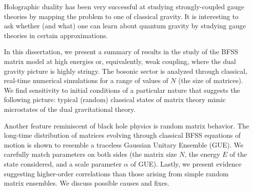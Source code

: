 Holographic duality has been very successful at studying strongly-coupled gauge theories by mapping the problem to one of classical gravity. It is interesting to ask whether (and what) one can learn about quantum gravity by studying gauge theories in certain approximations. 

In this dissertation, we present a summary of results in the study of the BFSS matrix model at high energies or, equivalently, weak coupling, where the dual gravity picture is highly stringy. The bosonic sector is analyzed through classical, real-time numerical simulations for a range of values of $N$ (the size of matrices). We find sensitivity to initial conditions of a particular nature that suggests the following picture: typical (random) classical states of matrix theory mimic microstates of the dual gravitational theory. 

Another feature reminiscent of black hole physics is random matrix behavior. The long-time distribution of matrices evolving through classical BFSS equations of motion is shown to resemble a traceless Gaussian Unitary Ensemble (GUE). We carefully match parameters on both sides (the matrix size $N$, the energy $E$ of the state considered, and a scale parameter $\alpha$ of GUE). Lastly, we present evidence suggesting higher-order correlations than those arising from simple random matrix ensembles. We discuss possible causes and fixes.